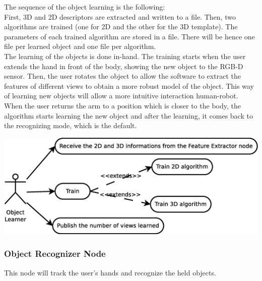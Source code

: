 \documentclass{article}
\begin{document}
The sequence of the object learning is the following:
\\
First, 3D and 2D descriptors are extracted and written to a file. Then, two algorithms are trained (one for 2D and the other for the 3D template). The parameters of each trained algorithm are stored in a file. There will be hence one file per learned object and one file per algorithm.
\\

The learning of the objects is done in-hand. The training starts when the user extends the hand in front of the body, showing the new object to the RGB-D sensor. Then, the user rotates the object to allow the software to extract the features of different views to obtain a more robust model of the object. This way of learning new objects will allow a more intuitive interaction human-robot. When the user returns the arm to a position which is closer to the body, the algorithm starts learning the new object and after the learning, it comes back to the recognizing mode, which is the default. 

\begin{center}

		\includegraphics[scale=0.4]{../diagrams/images/uc_learner.eps}
	\end{center}

\subsubsection{Object Recognizer Node} 
\hspace{0.5cm}This node will track the user's hands and recognize the held objects. 
\end{document}
